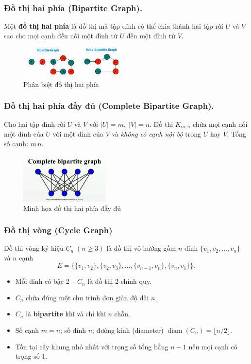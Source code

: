 \documentclass{article}
\begin{document}
\subsubsection{Đồ thị hai phía (Bipartite Graph).}
Một \textbf{đồ thị hai phía} là đồ thị mà tập đỉnh có thể chia thành hai tập rời $U$ và $V$ sao cho mọi cạnh đều nối một đỉnh từ $U$ đến một đỉnh từ $V$.

\begin{figure}[H]
    \centering
    \includegraphics[width=0.5\textwidth]{img/b1/biparitegraph.png}
    \caption{Phân biệt đồ thị hai phía}
    \label{biparite}
\end{figure}

\subsubsection{Đồ thị hai phía đầy đủ (Complete Bipartite Graph).}
Cho hai tập đỉnh rời \(U\) và \(V\) với \(|U| = m,\;|V| = n\).  
Đồ thị \(K_{m,n}\) chứa mọi cạnh nối một đỉnh của \(U\) với một đỉnh của \(V\) và \emph{không có cạnh nội bộ} trong \(U\) hay \(V\).  
Tổng số cạnh: \(m\,n\).

\begin{figure}[H]
    \centering
    \includegraphics[width=0.4\textwidth]{img/b1/completebiparitegraph.png}
    \caption{Minh họa đồ thị hai phía đầy đủ}
    \label{CBG}
\end{figure}

\subsubsection{Đồ thị vòng (Cycle Graph)}
Đồ thị vòng ký hiệu \(C_n\;(n \ge 3)\) là đồ thị vô hướng gồm \(n\) đỉnh
\(\{v_1,v_2,\dots ,v_n\}\) và \(n\) cạnh
\[
E = \bigl\{\{v_1,v_2\},\{v_2,v_3\},\dots ,\{v_{n-1},v_n\},\{v_n,v_1\}\bigr\}.
\]

\begin{itemize}
    \item Mỗi đỉnh có bậc \(2\) – \(C_n\) là đồ thị \(2\)-chính quy.
    \item \(C_n\) chứa đúng một chu trình đơn giản độ dài \(n\).
    \item \(C_n\) là \textbf{bipartite} khi và chỉ khi \(n\) chẵn.
    \item Số cạnh \(m = n\); số đỉnh \(n\); đường kính (diameter)  
          \(\operatorname{diam}(C_n) = \bigl\lfloor n/2 \bigr\rfloor\).
    \item Tồn tại cây khung nhỏ nhất với trọng số tổng bằng \(n-1\) nếu mọi cạnh có trọng số \(1\).
\end{itemize}
\end{document}
